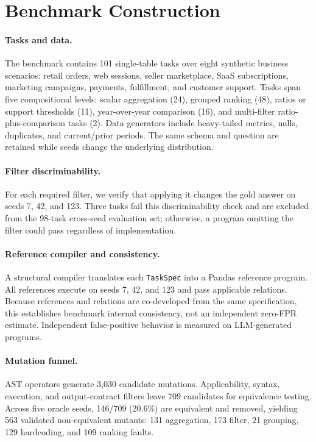 \documentclass{article}
\newcommand{\taskSpec}{\texttt{TaskSpec}\xspace}
\begin{document}
\section{Benchmark Construction}
\label{sec:benchmark}

\paragraph{Tasks and data.}
The benchmark contains 101 single-table tasks over eight synthetic business scenarios: retail orders, web sessions, seller marketplace, SaaS subscriptions, marketing campaigns, payments, fulfillment, and customer support. Tasks span five compositional levels: scalar aggregation (24), grouped ranking (48), ratios or support thresholds (11), year-over-year comparison (16), and multi-filter ratio-plus-comparison tasks (2). Data generators include heavy-tailed metrics, nulls, duplicates, and current/prior periods. The same schema and question are retained while seeds change the underlying distribution.

\paragraph{Filter discriminability.}
For each required filter, we verify that applying it changes the gold answer on seeds 7, 42, and 123. Three tasks fail this discriminability check and are excluded from the 98-task cross-seed evaluation set; otherwise, a program omitting the filter could pass regardless of implementation.

\paragraph{Reference compiler and consistency.}
A structural compiler translates each \taskSpec into a Pandas reference program. All references execute on seeds 7, 42, and 123 and pass applicable relations. Because references and relations are co-developed from the same specification, this establishes benchmark internal consistency, not an independent zero-FPR estimate. Independent false-positive behavior is measured on LLM-generated programs.

\paragraph{Mutation funnel.}
AST operators generate 3,030 candidate mutations. Applicability, syntax, execution, and output-contract filters leave 709 candidates for equivalence testing. Across five oracle seeds, 146/709 (20.6\%) are equivalent and removed, yielding 563 validated non-equivalent mutants: 131 aggregation, 173 filter, 21 grouping, 129 hardcoding, and 109 ranking faults.
\end{document}
